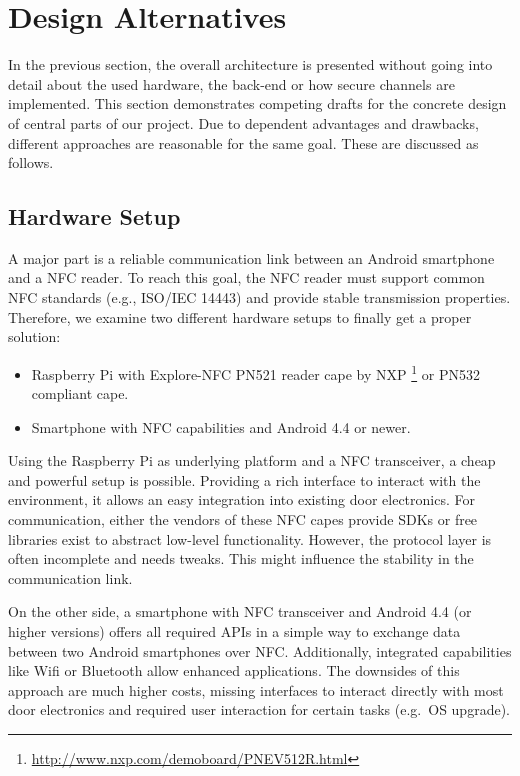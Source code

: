 \section{Design Alternatives}\label{sec:alt}
In the previous section, the overall architecture is presented without going into detail about the used hardware, the back-end or how secure channels are implemented.
This section demonstrates competing drafts for the concrete design of central parts of our project. 
Due to dependent advantages and drawbacks, different approaches are reasonable for the same goal. These are discussed as follows.


\subsection{Hardware Setup}
A major part is a reliable communication link between an Android smartphone and a NFC reader.
To reach this goal, the NFC reader must support common NFC standards (e.g., ISO/IEC 14443) and provide stable transmission properties.
Therefore, we examine two different hardware setups to finally get a proper solution:
%
\begin{itemize}
	\item Raspberry Pi with Explore-NFC PN521 reader cape by NXP \footnote{\url{http://www.nxp.com/demoboard/PNEV512R.html}} or PN532 compliant cape.
	\item Smartphone with NFC capabilities and Android 4.4 or newer.
\end{itemize}
%
Using the Raspberry Pi as underlying platform and a NFC transceiver, a cheap and powerful setup is possible.
Providing a rich interface to interact with the environment, it allows an easy integration into existing door electronics.
For communication, either the vendors of these NFC capes provide SDKs or free libraries exist to abstract low-level functionality. 
However, the protocol layer is often incomplete and needs tweaks. This might influence the stability in the communication link.

On the other side, a smartphone with NFC transceiver and Android 4.4 (or higher versions) offers all required APIs in a simple way to exchange data between two Android smartphones over NFC.
Additionally, integrated capabilities like Wifi or Bluetooth allow enhanced applications. The downsides of this approach are much higher costs, missing interfaces to interact directly with most door electronics and required user interaction for certain tasks (e.g.~OS upgrade).


